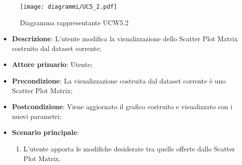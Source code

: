 \begin{figure}[h]
    \centering
    \texttt{[image: diagrammi/UC5\_2.pdf]}
    \caption{Diagramma rappresentante UCW5.2}
    \label{fig:UCW5.2}
\end{figure}


\begin{itemize}
    \item \textbf{Descrizione}: L’utente modifica la visualizzazione dello Scatter Plot Matrix
          costruito dal dataset corrente;

    \item \textbf{Attore primario}: Utente;

    \item \textbf{Precondizione}:   La visualizzazione costruita dal dataset corrente è uno Scatter Plot Matrix;

    \item \textbf{Postcondizione}:  Viene aggiornato il grafico costruito e visualizzato con i nuovi parametri;

    \item \textbf{Scenario principale}:
          \begin{enumerate}
              \item L'utente apporta le modifiche desiderate tra quelle offerte dallo Scatter Plot Matrix.
          \end{enumerate}
\end{itemize}


